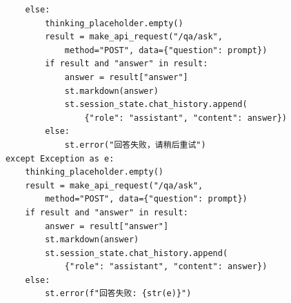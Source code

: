 \documentclass[a4paper,10pt]{article}
\begin{document}
\begin{lstlisting}
                else:
                    thinking_placeholder.empty()
                    result = make_api_request("/qa/ask",
                        method="POST", data={"question": prompt})
                    if result and "answer" in result:
                        answer = result["answer"]
                        st.markdown(answer)
                        st.session_state.chat_history.append(
                            {"role": "assistant", "content": answer})
                    else:
                        st.error("回答失败，请稍后重试")
            except Exception as e:
                thinking_placeholder.empty()
                result = make_api_request("/qa/ask",
                    method="POST", data={"question": prompt})
                if result and "answer" in result:
                    answer = result["answer"]
                    st.markdown(answer)
                    st.session_state.chat_history.append(
                        {"role": "assistant", "content": answer})
                else:
                    st.error(f"回答失败: {str(e)}")
\end{lstlisting}
\end{document}
